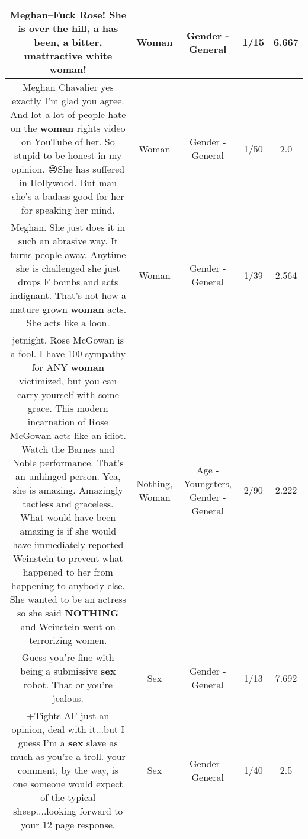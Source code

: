 \documentclass[11pt]{article}
\newlength\mylength
\begin{document}
\begin{center}
\begin{longtable}{|C{.65\mylength}|C{.30\mylength}|C{.12\mylength}|C{.12\mylength}|C{.12\mylength}|}
  \small Meghan--Fuck Rose!   She is over the hill,  a has been,  a bitter,  unattractive white \textbf{woman}!\normalsize   & Woman & Gender - General & 1/15 & 6.667 \\  \hline
  \small Meghan Chavalier yes exactly I'm glad you agree. And lot a lot of people hate on the \textbf{woman} rights video on YouTube of her. So stupid to be honest in my opinion. 😔She has suffered in Hollywood. But man she's a badass good for her for speaking her mind.\normalsize   & Woman & Gender - General & 1/50 & 2.0 \\  \hline
  \small Meghan.  She just does it in such an abrasive way.  It turns people away.  Anytime she is challenged she just drops F bombs and acts indignant.  That's not how a mature grown \textbf{woman} acts.  She acts like a loon.\normalsize   & Woman & Gender - General & 1/39 & 2.564 \\  \hline
  \small jetnight.  Rose McGowan is a fool.   I have 100 sympathy for ANY \textbf{woman} victimized, but you can carry yourself with some grace. This modern incarnation of Rose McGowan acts like an idiot.   Watch the Barnes and Noble performance.  That's an unhinged person.    Yea, she is amazing.  Amazingly tactless and graceless.     What would have been amazing is if she would have immediately reported Weinstein to prevent what happened to her from happening to anybody else.   She wanted to be an actress so she said \textbf{NOTHING} and Weinstein went on terrorizing women.\normalsize   & Nothing, Woman & Age - Youngsters, Gender - General & 2/90 & 2.222 \\  \hline
  \small Guess you're fine with being a submissive \textbf{sex} robot. That or you're jealous.\normalsize   & Sex & Gender - General & 1/13 & 7.692 \\  \hline
  \small +Tights AF just an opinion, deal with it...but I guess I'm a \textbf{sex} slave as much as you're a troll. your comment, by the way, is one someone would  expect of the typical sheep....looking forward to your 12 page response.\normalsize   & Sex & Gender - General & 1/40 & 2.5 \\  \hline

\end{longtable}
\end{center}
\end{document}
